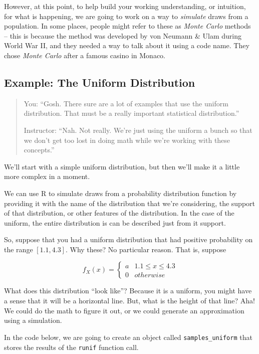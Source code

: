 \documentclass[
]{book}
\theoremstyle{definition}
\theoremstyle{definition}
\theoremstyle{definition}
\theoremstyle{definition}
\theoremstyle{remark}
\begin{document}
However, at this point, to help build your working understanding, or intuition, for what is happening, we are going to work on a way to \emph{simulate} draws from a population. In some places, people might refer to these as \emph{Monte Carlo} methods -- this is because the method was developed by von Neumann \& Ulam during World War II, and they needed a way to talk about it using a code name. They chose \emph{Monte Carlo} after a famous casino in Monaco.

\subsection{Example: The Uniform Distribution}\label{example-the-uniform-distribution}

\begin{quote}
You: ``Gosh. There sure are a lot of examples that use the uniform distribution. That must be a really important statistical distribution.''

Instructor: ``Nah. Not really. We're just using the uniform a bunch so that we don't get too lost in doing math while we're working with these concepts.''
\end{quote}

We'll start with a simple uniform distribution, but then we'll make it a little more complex in a moment.

We can use R to simulate draws from a probability distribution function by providing it with the name of the distribution that we're considering, the support of that distribution, or other features of the distribution. In the case of the uniform, the entire distribution is can be described just from it support.

So, suppose that you had a uniform distribution that had positive probability on the range \([1.1, 4.3]\). Why these? No particular reason. That is, suppose

\[
  f_{X}(x) = \begin{cases} 
    a & 1.1 \leq x \leq 4.3 \\ 
    0 & otherwise
  \end{cases}
\]

What does this distribution ``look like''? Because it is a uniform, you might have a sense that it will be a horizontal line. But, what is the height of that line? Aha! We could do the math to figure it out, or we could generate an approximation using a simulation.

In the code below, we are going to create an object called \texttt{samples\_uniform} that stores the results of the \texttt{runif} function call.
\end{document}
